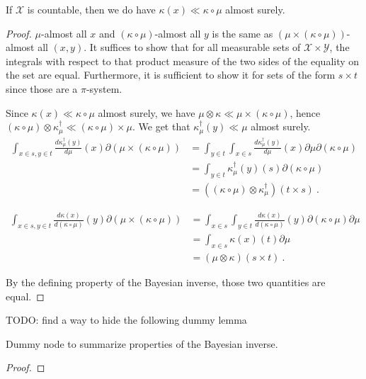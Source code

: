 If $\mathcal{X}$ is countable, then we do have $\kappa(x) \ll \kappa \circ \mu$ almost surely.

\begin{proof}\mathlibok
\uses{}
$\mu$-almost all $x$ and $(\kappa \circ \mu)$-almost all $y$ is the same as $(\mu \times (\kappa \circ \mu))$-almost all $(x, y)$.
It suffices to show that for all measurable sets of $\mathcal X \times \mathcal Y$, the integrals with respect to that product measure of the two sides of the equality on the set are equal. Furthermore, it is sufficient to show it for sets of the form $s \times t$ since those are a $\pi$-system.

Since $\kappa(x) \ll \kappa \circ \mu$ almost surely, we have $\mu \otimes \kappa \ll \mu \times (\kappa \circ \mu)$, hence $(\kappa \circ \mu) \otimes \kappa_\mu^\dagger \ll (\kappa \circ \mu) \times \mu$.
We get that $\kappa_\mu^\dagger(y) \ll \mu$ almost surely.
\begin{align*}
\int_{x \in s, y \in t} \frac{d \kappa_\mu^\dagger(y)}{d \mu}(x) \partial (\mu \times (\kappa \circ \mu))
&= \int_{y \in t} \int_{x \in s} \frac{d \kappa_\mu^\dagger(y)}{d \mu}(x) \partial \mu \partial (\kappa \circ \mu)
\\
&= \int_{y \in t} \kappa_\mu^\dagger(y)(s) \partial (\kappa \circ \mu)
\\
&= ((\kappa \circ \mu) \otimes \kappa_\mu^\dagger) (t \times s)
\: .
\end{align*}

\begin{align*}
\int_{x \in s, y \in t} \frac{d \kappa(x)}{d(\kappa \circ \mu)}(y) \partial (\mu \times (\kappa \circ \mu))
&= \int_{x \in s} \int_{y \in t} \frac{d \kappa(x)}{d(\kappa \circ \mu)}(y) \partial (\kappa \circ \mu) \partial \mu
\\
&= \int_{x \in s} \kappa(x)(t) \partial \mu
\\
&= (\mu \otimes \kappa) (s \times t)
\: .
\end{align*}

By the defining property of the Bayesian inverse, those two quantities are equal.
\end{proof}



TODO: find a way to hide the following dummy lemma
\begin{lemma}
  \label{lem:bayesInv_properties}
  \leanok
  Dummy node to summarize properties of the Bayesian inverse.
\end{lemma}

\begin{proof}\leanok
{}
\end{proof}